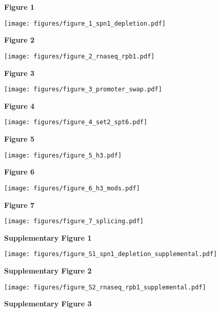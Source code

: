 \documentclass[9pt, letterpaper]{extarticle}
\begin{document}
\textbf{\large Figure 1}

{\centering \texttt{[image: figures/figure\_1\_spn1\_depletion.pdf]}\par}

\newpage

\textbf{\large Figure 2}

{\centering \texttt{[image: figures/figure\_2\_rnaseq\_rpb1.pdf]}\par}

\newpage

\textbf{\large Figure 3}

{\texttt{[image: figures/figure\_3\_promoter\_swap.pdf]}\par}

\newpage

\textbf{\large Figure 4}

{\centering \texttt{[image: figures/figure\_4\_set2\_spt6.pdf]}\par}

\newpage

\textbf{\large Figure 5}

{\texttt{[image: figures/figure\_5\_h3.pdf]}\par}

\newpage

\textbf{\large Figure 6}

{\centering \texttt{[image: figures/figure\_6\_h3\_mods.pdf]}\par}

\newpage

\textbf{\large Figure 7}

{\centering \texttt{[image: figures/figure\_7\_splicing.pdf]}\par}

\newpage

\textbf{\large Supplementary Figure 1}

{\centering \texttt{[image: figures/figure\_S1\_spn1\_depletion\_supplemental.pdf]}\par}

\newpage

\textbf{\large Supplementary Figure 2}

{\centering \texttt{[image: figures/figure\_S2\_rnaseq\_rpb1\_supplemental.pdf]}\par}

\newpage

\textbf{\large Supplementary Figure 3}
\end{document}
